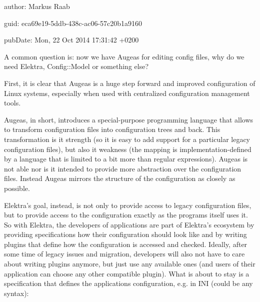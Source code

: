 \label{doc_news_2014-10-22_augeas_md_md_doc_news_2014_10_22_augeas}%
%

\begin{DoxyItemize}
\item author\+: Markus Raab
\item guid\+: eca69e19-\/5ddb-\/438c-\/ac06-\/57c20b1a9160
\item pub\+Date\+: Mon, 22 Oct 2014 17\+:31\+:42 +0200
\end{DoxyItemize}

A common question is\+: now we have Augeas for editing config files, why do we need Elektra, Config\+::\+Model or something else?

First, it is clear that Augeas is a huge step forward and improved configuration of Linux systems, especially when used with centralized configuration management tools.

Augeas, in short, introduces a special-\/purpose programming language that allows to transform configuration files into configuration trees and back. This transformation is it strength (so it is easy to add support for a particular legacy configuration files), but also it weakness (the mapping is implementation-\/defined by a language that is limited to a bit more than regular expressions). Augeas is not able nor is it intended to provide more abstraction over the configuration files. Instead Augeas mirrors the structure of the configuration as closely as possible.

Elektra’s goal, instead, is not only to provide access to legacy configuration files, but to provide access to the configuration exactly as the programs itself uses it. So with Elektra, the developers of applications are part of Elektra’s ecosystem by providing specifications how their configuration should look like and by writing plugins that define how the configuration is accessed and checked. Ideally, after some time of legacy issues and migration, developers will also not have to care about writing plugins anymore, but just use any available ones (and users of their application can choose any other compatible plugin). What is about to stay is a specification that defines the application\textquotesingle{}s configuration, e.\+g. in INI (could be any syntax)\+:


\begin{DoxyCode}{0}

\end{DoxyCode}


